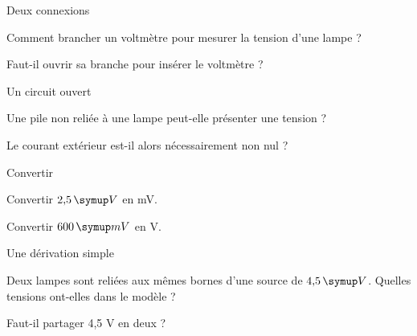 \par\noindent\begin{minipage}{\linewidth}
\begin{exercice}[1]{Deux connexions}
\begin{questions}
\item Comment brancher un voltmètre pour mesurer la tension d’une lampe ?
\item Faut-il ouvrir sa branche pour insérer le voltmètre ?
\end{questions}
\end{exercice}
\end{minipage}
\par\noindent\begin{minipage}{\linewidth}
\begin{exercice}[1]{Un circuit ouvert}
\begin{questions}
\item Une pile non reliée à une lampe peut-elle présenter une tension ?
\item Le courant extérieur est-il alors nécessairement non nul ?
\end{questions}
\end{exercice}
\end{minipage}
\par\noindent\begin{minipage}{\linewidth}
\begin{exercice}[1]{Convertir}
\begin{questions}
\item Convertir $2{,}5\unite V$ en mV.
\item Convertir $600\unite{mV}$ en V.
\end{questions}
\end{exercice}
\end{minipage}
\par\noindent\begin{minipage}{\linewidth}
\begin{exercice}[1]{Une dérivation simple}
\begin{questions}
\item Deux lampes sont reliées aux mêmes bornes d’une source de $4{,}5\unite V$. Quelles tensions ont-elles dans le modèle ?
\item Faut-il partager 4,5 V en deux ?
\end{questions}
\end{exercice}
\end{minipage}
\clearpage{}
